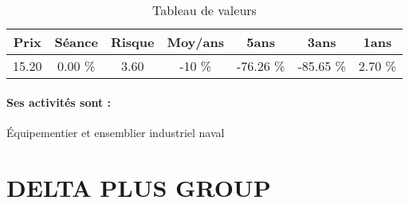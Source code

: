 \documentclass[11pt,a4paper]{report}%
\begin{document}
\begin{table}[H]
  \centering
    \begin{tabular}{|c|c|c|c|c|c|c|}
    \hline
    Prix & Séance & Risque  & Moy/ans & 5ans & 3ans & 1ans \\
    \hline
    15.20 &    0.00 \%    & 3.60 & -10 \% & -76.26 \% & -85.65 \% & 2.70 \% \\
    \hline
    \end{tabular}%
        \label{tab:table_CNIM GROUPE SA}%
      \caption{Tableau de valeurs}
\end{table}%

\paragraph{Ses activités sont : } Équipementier et ensemblier industriel naval 
    
    \newpage

\section{DELTA PLUS GROUP}
\end{document}

